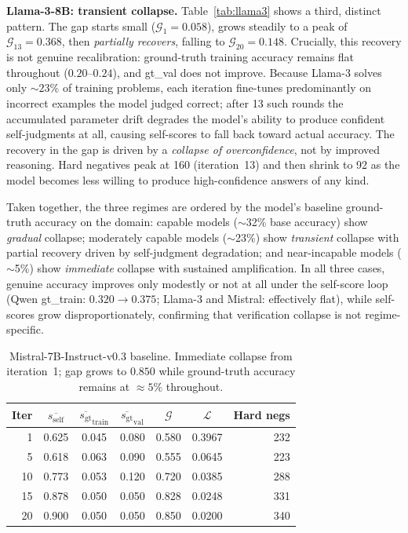 \documentclass{article}
\newcommand{\gap}{\mathcal{G}}          %
\newcommand{\self}{s_{\text{self}}}     %
\newcommand{\gt}{s_{\text{gt}}}         %
\begin{document}
\textbf{Llama-3-8B: transient collapse.}
Table~\ref{tab:llama3} shows a third, distinct pattern.
The gap starts small ($\gap_1 = 0.058$), grows steadily to a peak of
$\gap_{13} = 0.368$, then \emph{partially recovers}, falling to
$\gap_{20} = 0.148$.
Crucially, this recovery is not genuine recalibration: ground-truth training
accuracy remains flat throughout ($0.20$--$0.24$), and gt\_val does not
improve.
Because Llama-3 solves only ${\sim}23\%$ of training problems, each iteration
fine-tunes predominantly on incorrect examples the model judged correct;
after 13 such rounds the accumulated parameter drift degrades the
model's ability to produce confident self-judgments at all, causing
self-scores to fall back toward actual accuracy.
The recovery in the gap is driven by a \emph{collapse of overconfidence},
not by improved reasoning.
Hard negatives peak at 160 (iteration~13) and then shrink to 92 as the model
becomes less willing to produce high-confidence answers of any kind.

Taken together, the three regimes are ordered by the model's baseline
ground-truth accuracy on the domain:
capable models ($\sim$32\% base accuracy) show \emph{gradual}
collapse; moderately capable models ($\sim$23\%) show \emph{transient}
collapse with partial recovery driven by self-judgment degradation; and
near-incapable models ($\sim$5\%) show \emph{immediate} collapse with
sustained amplification.
In all three cases, genuine accuracy improves only modestly or not at all
under the self-score loop (Qwen gt\_train: $0.320 \to 0.375$; Llama-3 and
Mistral: effectively flat), while self-scores grow disproportionately,
confirming that verification collapse is not regime-specific.

\begin{table}[h]
\centering
\caption{Mistral-7B-Instruct-v0.3 baseline. Immediate collapse from
iteration~1; gap grows to $0.850$ while ground-truth
accuracy remains at $\approx\!5\%$ throughout.}
\label{tab:mistral}
\small
\begin{tabular}{rcccccr}
\toprule
Iter & $\overline{\self}$ & $\overline{\gt}_\text{train}$ & $\overline{\gt}_\text{val}$ & $\gap$ & $\mathcal{L}$ & Hard negs \\
\midrule
1  & 0.625 & 0.045 & 0.080 & 0.580 & 0.3967 & 232 \\
5  & 0.618 & 0.063 & 0.090 & 0.555 & 0.0645 & 223 \\
10 & 0.773 & 0.053 & 0.120 & 0.720 & 0.0385 & 288 \\
15 & 0.878 & 0.050 & 0.050 & 0.828 & 0.0248 & 331 \\
20 & 0.900 & 0.050 & 0.050 & 0.850 & 0.0200 & 340 \\
\bottomrule
\end{tabular}
\end{table}
\end{document}
